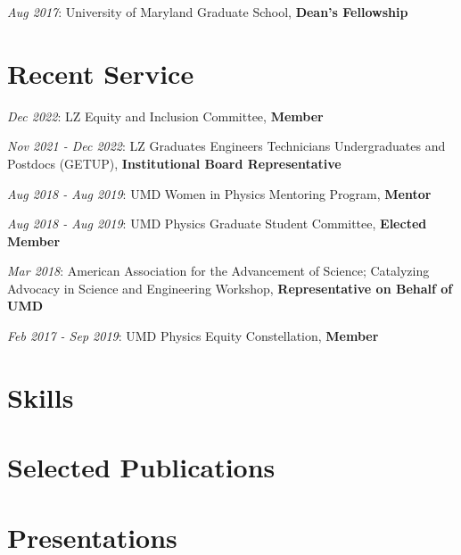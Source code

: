 \documentclass[
  10pt,
]{scrartcl}
\begin{document}
\textcolor{mygray}{\textit{Aug 2017}}: University of Maryland Graduate
School, \textbf{Dean's Fellowship}

\hypertarget{fa-people-carry-recent-service}{%
\section{\texorpdfstring{ Recent
Service}{ Recent Service}}\label{fa-people-carry-recent-service}}

\textcolor{mygray}{\textit{Dec 2022}}: LZ Equity and Inclusion
Committee, \textbf{Member}

\textcolor{mygray}{\textit{Nov 2021 - Dec 2022}}: LZ Graduates Engineers
Technicians Undergraduates and Postdocs (GETUP), \textbf{Institutional
Board Representative}

\textcolor{mygray}{\textit{Aug 2018 - Aug 2019}}: UMD Women in Physics
Mentoring Program, \textbf{Mentor}

\textcolor{mygray}{\textit{Aug 2018 - Aug 2019}}: UMD Physics Graduate
Student Committee, \textbf{Elected Member}

\textcolor{mygray}{\textit{Mar 2018}}: American Association for the
Advancement of Science; Catalyzing Advocacy in Science and Engineering
Workshop, \textbf{Representative on Behalf of UMD}

\textcolor{mygray}{\textit{Feb 2017 - Sep 2019}}: UMD Physics Equity
Constellation, \textbf{Member}

\hypertarget{fa-tools-skills}{%
\section{\texorpdfstring{
Skills}{ Skills}}\label{fa-tools-skills}}

\hypertarget{fa-pen-nib-selected-publications}{%
\section{\texorpdfstring{ Selected
Publications}{ Selected Publications}}\label{fa-pen-nib-selected-publications}}

\newrefcontext[sorting=ddt]
\printbibliography[heading=none, keyword={mypublication}, keyword={selectedworks}]
\endrefcontext

\hypertarget{fa-chart-bar-presentations}{%
\section{\texorpdfstring{
Presentations}{ Presentations}}\label{fa-chart-bar-presentations}}

\newrefcontext[sorting=ddt]
\printbibliography[heading=none, keyword={mypresentation}, keyword={selectedworks}]
\endrefcontext


\end{document}
